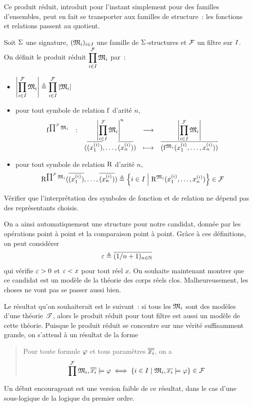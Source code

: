 Ce produit réduit, introduit pour l'instant simplement pour des familles
d'ensembles, peut en fait se transporter aux familles de structure~: les
fonctions et relations passent au quotient.

\begin{definition}
  Soit $\Sigma$ une signature, $(\mathfrak{M}_i)_{i \in I}$ une famille de
  $\Sigma$-structures et $\mathcal{F}$ un filtre sur $I$. On définit le
  produit réduit
  $\displaystyle\prod_{i \in I}^{\mathcal{F}} \mathfrak{M}_i$ par~:
  \begin{itemize}
  \item $\displaystyle\left\vert \prod_{i \in I}^{\mathcal{F}}\mathfrak{M}_i\right\vert \triangleq
    \prod_{i \in I}^{\mathcal{F}}\left\vert \mathfrak{M}_i\right\vert$
  \item pour tout symbole de relation $\mathrm{f}$ d'arité $n$,
    \[
    \makeFun
        {\toMP{\symbF}{\prod^{\varFil}\varMM_i}}
        {\carM{\prod_{i \in \indSet}^{\varFil}\varMM_i}^n}
        {\carM{\prod_{i \in \indSet}^{\varFil}\varMM_i}}
        {(\clas{(x_{1}^{(i)})},\ldots,\clas{(x_{n}^{(i)})})}
        {\clas{(\toMP{\symbF}{\varMM_i}(x_{1}^{(i)},\ldots,x_{n}^{(i)}))}}
    \]
  \item pour tout symbole de relation $\mathrm{R}$ d'arité $n$,
    \[\mathrm{R}^{\prod^{\mathcal{F}}\mathfrak{M}_i}
    (\overline{(x_{1}^{(i)})},\ldots,\overline{(x_{n}^{(i)})}) \triangleq
    \left\{ i \in I \;\middle\vert\; \mathrm{R}^{\mathfrak{M}_i}(x_{1}^{(i)},\ldots,x_{n}^{(i)}) \right\}
    \in\mathcal{F}
    \]
  \end{itemize}
\end{definition}

\begin{exercise}
  Vérifier que l'interprétation des symboles de fonction et de relation ne
  dépend pas des représentants choisis.
\end{exercise}

On a ainsi automatiquement une structure pour notre candidat, donnée par les
opérations point à point et la comparaison point à point. Grâce à ces
définitions, on peut considérer
\[\varepsilon\triangleq \overline{(1/n+1)_{n \in \mathbb N}}\]
qui vérifie $\varepsilon > 0$ et $\varepsilon < x$ pour tout réel $x$. On souhaite
maintenant montrer que ce candidat est un modèle de la théorie des corps réels
clos. Malheureusement, les choses ne vont pas se passer aussi bien.

Le résultat qu'on souhaiterait est le suivant~: si tous les $\mathfrak{M}_i$ sont des
modèles d'une théorie $\mathscr T$, alors le produit réduit pour tout filtre est
aussi un modèle de cette théorie. Puisque le produit réduit se concentre sur une
vérité \og suffisamment grande\fg, on s'attend à un résultat de la forme
\begin{quotation}
  \noindent
  Pour toute formule $\varphi$ et tous paramètres $\overline{\overline{x_i}}$,
  on a
  \[\prod^{\mathcal{F}} \mathfrak{M}_i,\overline{\overline{x_i}}\models \varphi \iff
  \left\{ i \in I \;\middle\vert\; \mathfrak{M}_i,\overline{x_i} \models \varphi \right\}
  \in \mathcal{F}\]
\end{quotation}
Un début encourageant est une version faible de ce résultat, dans le cas d'une
sous-logique de la logique du premier ordre.

